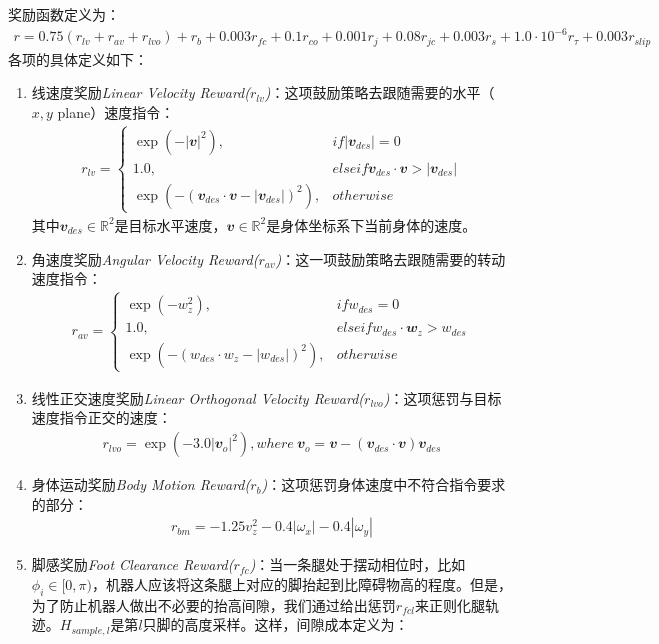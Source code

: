 奖励函数定义为：
\begin{align}
  r=0.75(r_{lv}+r_{av}+r_{lvo})+r_b+0.003r_{fc}+0.1r_{co}+0.001r_j+0.08r_{jc}+0.003r_s+1.0\cdot 10^{-6}r_{\tau}+0.003r_{slip}
\end{align}
各项的具体定义如下：
\begin{enumerate}
  \item 线速度奖励\emph{Linear Velocity Reward($r_{lv}$)}：这项鼓励策略去跟随需要的水平（$x,y$ plane）速度指令：\begin{align}
    r_{lv}=\begin{cases}
    \exp(-|\mathbfit{v}|^2), & if |\mathbfit{v}_{des}|=0\\
    1.0, & else if \mathbfit{v}_{des}\cdot\mathbfit{v}>|\mathbfit{v}_{des}|\\
    \exp(-(\mathbfit{v}_{des}\cdot\mathbfit{v}-|\mathbfit{v}_{des}|)^2), & otherwise
  \end{cases}
  \end{align}其中$\mathbfit{v}_{des}\in\mathbb{R}^2$是目标水平速度，$\mathbfit{v}\in\mathbb{R}^2$是身体坐标系下当前身体的速度。
  \item 角速度奖励\emph{Angular Velocity Reward($r_{av}$)}：这一项鼓励策略去跟随需要的转动速度指令：\begin{align}
    r_{av}=\begin{cases}
    \exp(-w_z^2), & if w_{des}=0\\
    1.0, & else if w_{des}\cdot\mathbfit{w}_z>w_{des}\\
    \exp(-(w_{des}\cdot w_z-|w_{des}|)^2), & otherwise
  \end{cases}
  \end{align}
  \item 线性正交速度奖励\emph{Linear Orthogonal Velocity Reward($r_{lvo}$)}：这项惩罚与目标速度指令正交的速度：\begin{align}
    r_{lvo}=\exp(-3.0|\mathbfit{v}_o|^2), where\ \mathbfit{v}_o=\mathbfit{v}-(\mathbfit{v}_{des}\cdot\mathbfit{v})\mathbfit{v}_{des}
  \end{align}
  \item 身体运动奖励\emph{Body Motion Reward($r_{b}$)}：这项惩罚身体速度中不符合指令要求的部分：\begin{align}
    r_{bm}=-1.25v_z^2-0.4|\omega_x|-0.4|\omega_y|
  \end{align}
  \item 脚感奖励\emph{Foot Clearance Reward($r_{fc}$)}：当一条腿处于摆动相位时，比如$\phi_i\in[0,\pi)$，机器人应该将这条腿上对应的脚抬起到比障碍物高的程度。但是，为了防止机器人做出不必要的抬高间隙，我们通过给出惩罚$r_{fcl}$来正则化腿轨迹。$H_{sample,l}$是第$l$只脚的高度采样。这样，间隙成本定义为：\begin{align}

\end{align}
\end{enumerate}

